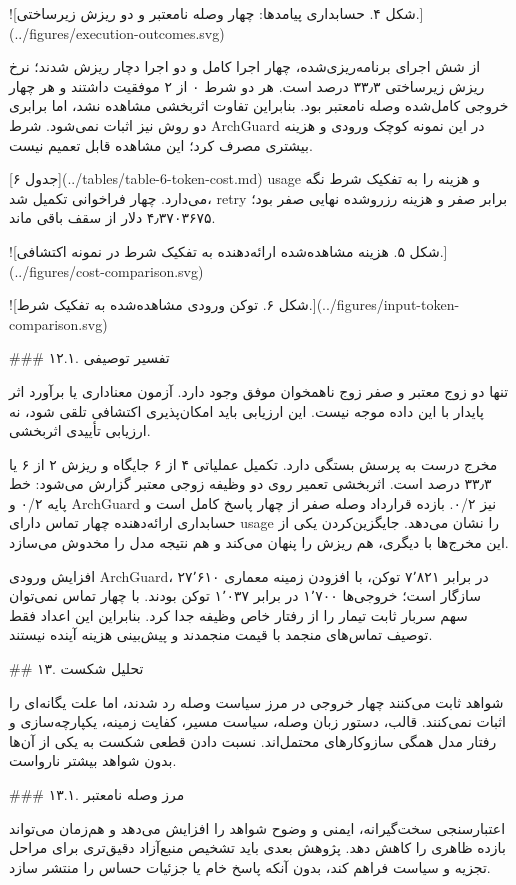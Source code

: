\documentclass[11pt,a4paper]{article}
\begin{document}
![شکل ۴. حسابداری پیامدها: چهار وصله نامعتبر و دو ریزش زیرساختی.](../figures/execution-outcomes.svg)

از شش اجرای برنامه‌ریزی‌شده، چهار اجرا کامل و دو اجرا دچار ریزش شدند؛ نرخ ریزش زیرساختی ۳۳٫۳ درصد
است. هر دو شرط ۰ از ۲ موفقیت داشتند و هر چهار خروجی کامل‌شده وصله نامعتبر بود. بنابراین تفاوت اثربخشی
مشاهده نشد، اما برابری دو روش نیز اثبات نمی‌شود. شرط ArchGuard در این نمونه کوچک ورودی و هزینه بیشتری
مصرف کرد؛ این مشاهده قابل تعمیم نیست.

[جدول ۶](../tables/table-6-token-cost.md) usage و هزینه را به تفکیک شرط نگه می‌دارد. چهار فراخوانی
تکمیل شد، retry برابر صفر و هزینه رزروشده نهایی صفر بود؛ ۴٫۳۷۰۳۶۷۵ دلار از سقف باقی ماند.

![شکل ۵. هزینه مشاهده‌شده ارائه‌دهنده به تفکیک شرط در نمونه اکتشافی.](../figures/cost-comparison.svg)

![شکل ۶. توکن ورودی مشاهده‌شده به تفکیک شرط.](../figures/input-token-comparison.svg)

\#\#\# ۱۲.۱. تفسیر توصیفی

تنها دو زوج معتبر و صفر زوج ناهمخوان موفق وجود دارد. آزمون معناداری یا برآورد اثر پایدار با این داده
موجه نیست. این ارزیابی باید امکان‌پذیری اکتشافی تلقی شود، نه ارزیابی تأییدی اثربخشی.

مخرج درست به پرسش بستگی دارد. تکمیل عملیاتی ۴ از ۶ جایگاه و ریزش ۲ از ۶ یا ۳۳٫۳ درصد است. اثربخشی
تعمیر روی دو وظیفه زوجی معتبر گزارش می‌شود: خط پایه ۰/۲ و ArchGuard نیز ۰/۲. بازده قرارداد وصله صفر
از چهار پاسخ کامل است و حسابداری ارائه‌دهنده چهار تماس دارای usage را نشان می‌دهد. جایگزین‌کردن یکی
از این مخرج‌ها با دیگری، هم ریزش را پنهان می‌کند و هم نتیجه مدل را مخدوش می‌سازد.

افزایش ورودی ArchGuard، ۲۷٬۶۱۰ در برابر ۷٬۸۲۱ توکن، با افزودن زمینه معماری سازگار است؛ خروجی‌ها
۱٬۷۰۰ در برابر ۱٬۰۳۷ توکن بودند. با چهار تماس نمی‌توان سهم سربار ثابت تیمار را از رفتار خاص وظیفه
جدا کرد. بنابراین این اعداد فقط توصیف تماس‌های منجمد با قیمت منجمدند و پیش‌بینی هزینه آینده نیستند.

\#\# ۱۳. تحلیل شکست

شواهد ثابت می‌کنند چهار خروجی در مرز سیاست وصله رد شدند، اما علت یگانه‌ای را اثبات نمی‌کنند. قالب،
دستور زبان وصله، سیاست مسیر، کفایت زمینه، یکپارچه‌سازی و رفتار مدل همگی سازوکارهای محتمل‌اند. نسبت دادن
قطعی شکست به یکی از آن‌ها بدون شواهد بیشتر نارواست.

\#\#\# ۱۳.۱. مرز وصله نامعتبر

اعتبارسنجی سخت‌گیرانه، ایمنی و وضوح شواهد را افزایش می‌دهد و هم‌زمان می‌تواند بازده ظاهری را کاهش دهد.
پژوهش بعدی باید تشخیص منبع‌آزاد دقیق‌تری برای مراحل تجزیه و سیاست فراهم کند، بدون آنکه پاسخ خام یا
جزئیات حساس را منتشر سازد.
\end{document}
